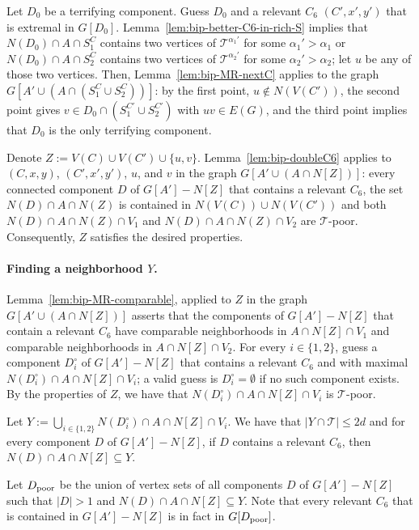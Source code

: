 \documentclass[11pt,a4paper]{article}
\theoremstyle{definition}
\def\T{\mathcal{T}}
\begin{document}
Let $D_0$ be a terrifying component.
Guess $D_0$ and a relevant $C_6$ $(C',x',y')$ that is extremal in $G[D_0]$. 
Lemma~\ref{lem:bip-better-C6-in-rich-S} implies that $N(D_0) \cap A \cap S_1^C$ contains two vertices
of $\T^{\alpha_1'}$ for some $\alpha_1' > \alpha_1$ or $N(D_0) \cap A \cap S_2^C$ contains two vertices of $\T^{\alpha_2'}$ for some $\alpha_2' > \alpha_2$;
let $u$ be any of those two vertices. 
Then, Lemma~\ref{lem:bip-MR-nextC} applies to the graph
$G[A' \cup (A \cap (S_1^C \cup S_2^C))]$: 
by the first point, $u \notin N(V(C'))$,
the second point gives $v \in D_0 \cap (S_1^{C'} \cup S_2^{C'})$ with $uv \in E(G)$,
and the third point implies that $D_0$ is the only terrifying component. 

Denote $Z := V(C) \cup V(C') \cup \{u,v\}$. 
Lemma~\ref{lem:bip-doubleC6} applies to $(C,x,y)$, $(C',x',y')$, $u$, and $v$
in the graph $G[A' \cup (A \cap N[Z])]$:
every connected component $D$ of $G[A']-N[Z]$ that contains a relevant $C_6$,
the set $N(D) \cap A \cap N(Z)$ is contained in $N(V(C)) \cup N(V(C'))$ 
and both $N(D) \cap A \cap N(Z) \cap V_1$ and $N(D) \cap A \cap N(Z) \cap V_2$ are $\T$-poor.
Consequently, $Z$ satisfies the desired properties.

\paragraph{Finding a neighborhood $Y$.}
Lemma~\ref{lem:bip-MR-comparable}, applied to $Z$ in the graph $G[A' \cup (A \cap N[Z])]$ asserts
that the components of $G[A']-N[Z]$ that contain a relevant $C_6$ 
have comparable neighborhoods in $A \cap N[Z] \cap V_1$ and comparable neighborhoods
in $A \cap N[Z] \cap V_2$. 
For every $i \in \{1,2\}$, guess a component $D_i^\circ$ of $G[A']-N[Z]$
that contains a relevant $C_6$ and with maximal $N(D_i^\circ) \cap A \cap N[Z] \cap V_i$;
a valid guess is $D_i^\circ = \emptyset$ if no such component exists. 
By the properties of $Z$, we have that $N(D_i^\circ) \cap A \cap N[Z] \cap V_i$ is $\T$-poor.

Let $Y := \bigcup_{i \in \{1,2\}} N(D_i^\circ) \cap A \cap N[Z] \cap V_i$. 
We have that $|Y \cap \T| \leq 2d$ and for every component $D$ of $G[A']-N[Z]$,
if $D$ contains a relevant $C_6$, then $N(D) \cap A \cap N[Z] \subseteq Y$. 

Let $D_{\mathrm{poor}}$ be the union of vertex sets of all components $D$ of $G[A']-N[Z]$
such that $|D| > 1$ and $N(D) \cap A \cap N[Z] \subseteq Y$.
Note that every relevant $C_6$ that is contained in $G[A']-N[Z]$ is in fact in $G[D_{\mathrm{poor}}]$. 
\end{document}
